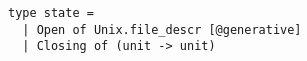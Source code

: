 \begin{verbatim}
type state =
  | Open of Unix.file_descr [@generative]
  | Closing of (unit -> unit)
\end{verbatim}

%
%
%
%
%
